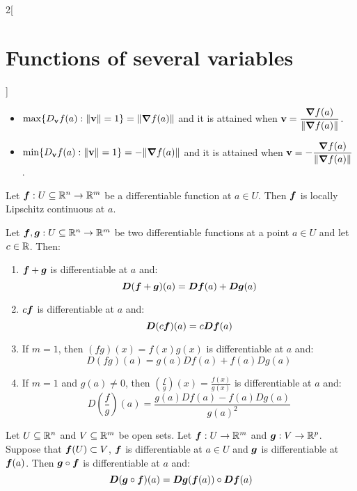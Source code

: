 \documentclass[../../../main.tex]{subfiles}
\begin{document}
\begin{multicols}{2}[\section{Functions of several variables}]
\begin{prop}
\begin{itemize}
      \item $\displaystyle\max\{D_{\vb{v}}f(a):\|\vb{v}\|=1\}=\|\grad f(a)\|$ and it is attained when $\displaystyle \vb{v}=\frac{\grad f(a)}{\|\grad f(a)\|}$.
      \item $\displaystyle\min\{D_{\vb{v}}f(a):\|\vb{v}\|=1\}=-\|\grad f(a)\|$ and it is attained when $\displaystyle \vb{v}=-\frac{\grad f(a)}{\|\grad f(a)\|}$.
    \end{itemize}
  \end{prop}
  \begin{theorem}
    Let $\boldsymbol{f}:U\subseteq\mathbb{R}^n\rightarrow\mathbb{R}^m$ be a differentiable function at $a\in U$. Then $\boldsymbol{f}$ is locally Lipschitz continuous at $a$.
  \end{theorem}
  \begin{theorem}
    Let $\boldsymbol{f},\boldsymbol{g}:U\subseteq\mathbb{R}^n\to\mathbb{R}^m$ be two differentiable functions at a point $a\in U$ and let $c\in\mathbb{R} $. Then:
    \begin{enumerate}
      \item $\boldsymbol{f}+\boldsymbol{g}$ is differentiable at $a$ and: $$\boldsymbol{D}(\boldsymbol{f}+\boldsymbol{g})(a)=\boldsymbol{Df}(a)+\boldsymbol{Dg}(a)$$
      \item $c\boldsymbol{f}$ is differentiable at $a$ and:
            $$\boldsymbol{D}(c\boldsymbol{f})(a)=c\boldsymbol{Df}(a)$$
      \item If $m=1$, then $(fg)(x)=f(x)g(x)$ is differentiable at $a$ and: $$D(fg)(a)=g(a)Df(a)+f(a)Dg(a)$$
      \item If $m=1$ and $g(a)\ne0$, then $\displaystyle\left(\frac{f}{g}\right)(x)=\frac{f(x)}{g(x)}$ is differentiable at $a$ and: $$D\left(\frac{f}{g}\right)(a)=\frac{g(a)Df(a)-f(a)Dg(a)}{{g(a)}^2}$$
    \end{enumerate}
  \end{theorem}
  \begin{theorem}
    Let $U\subseteq\mathbb{R}^n$ and $V\subseteq\mathbb{R}^m$ be open sets. Let $\boldsymbol{f}:U\rightarrow\mathbb{R}^m$ and $\boldsymbol{g}:V\rightarrow\mathbb{R}^p$. Suppose that $\boldsymbol{f}(U)\subset V$, $\boldsymbol{f}$ is differentiable at $a\in U$ and $\boldsymbol{g}$ is differentiable at $\boldsymbol{f}(a)$. Then $\boldsymbol{g}\circ \boldsymbol{f}$ is differentiable at $a$ and: $$\boldsymbol{D}(\boldsymbol{g}\circ \boldsymbol{f})(a)=\boldsymbol{Dg}(\boldsymbol{f}(a))\circ \boldsymbol{Df}(a)$$

\end{theorem}
\end{multicols}
\end{document}
